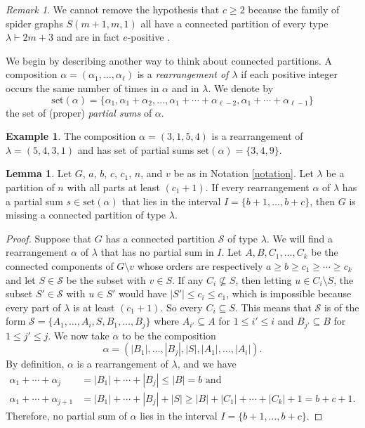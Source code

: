 \documentclass[12pt]{amsart}  %
\theoremstyle{definition}
\newtheorem{lemma}[theorem]{Lemma}
\newtheorem{example}[theorem]{Example}
\theoremstyle{remark}
\newtheorem{remark}[theorem]{Remark}
\numberwithin{equation}{section}
\begin{document}
\begin{remark}
We cannot remove the hypothesis that $c\geq 2$ because the family of spider graphs $S(m+1,m,1)$ all have a connected partition of every type $\lambda\vdash 2m+3$ and are in fact $e$-positive \cite[Theorem 3.2]{eposclawcon}.
\end{remark}

We begin by describing another way to think about connected partitions. A composition $\alpha=(\alpha_1,\ldots,\alpha_\ell)$ is a \emph{rearrangement of $\lambda$} if each positive integer occurs the same number of times in $\alpha$ and in $\lambda$. We denote by
\begin{equation*}
\text{set}(\alpha)=\{\alpha_1,\alpha_1+\alpha_2,\ldots,\alpha_1+\cdots+\alpha_{\ell-2},\alpha_1+\cdots+\alpha_{\ell-1}\}
\end{equation*}
the set of (proper) \emph{partial sums} of $\alpha$.

\begin{example}
The composition $\alpha=(3,1,5,4)$ is a rearrangement of $\lambda=(5,4,3,1)$ and has set of partial sums $\text{set}(\alpha)=\{3,4,9\}$.
\end{example}

\begin{lemma}\label{lem:partsums} Let $G$, $a$, $b$, $c$, $c_1$, $n$, and $v$ be as in Notation \ref{notation}. Let $\lambda$ be a partition of $n$ with all parts at least $(c_1+1)$. If every rearrangement $\alpha$ of $\lambda$ has a partial sum $s\in\text{set}(\alpha)$ that lies in the interval $I=\{b+1,\ldots,b+c\}$, then $G$ is missing a connected partition of type $\lambda$. 
\end{lemma}

\begin{proof}
Suppose that $G$ has a connected partition $\mathcal S$ of type $\lambda$. We will find a rearrangement $\alpha$ of $\lambda$ that has no partial sum in $I$. Let $A,B,C_1,\ldots,C_k$ be the connected components of $G\setminus v$ whose orders are respectively $a\geq b\geq c_1\geq \cdots\geq c_k$ and let $S\in\mathcal S$ be the subset with $v\in S$. If any $C_i\nsubseteq S$, then letting $u\in C_i\setminus S$, the subset $S'\in\mathcal S$ with $u\in S'$ would have $|S'|\leq c_i\leq c_1$, which is impossible because every part of $\lambda$ is at least $(c_1+1)$. So every $C_i\subseteq S$. This means that $\mathcal S$ is of the form
$\mathcal S=\{A_1,\ldots,A_i,S,B_1,\ldots,B_j\}$
where $A_{i'}\subseteq A$ for $1\leq i'\leq i$ and $B_{j'}\subseteq B$ for $1\leq j'\leq j$. We now take $\alpha$ to be the composition
\begin{equation*}
\alpha=(|B_1|,\ldots,|B_j|,|S|,|A_1|,\ldots,|A_i|).
\end{equation*}
By definition, $\alpha$ is a rearrangement of $\lambda$, and we have
\begin{align*}
\alpha_1+\cdots+\alpha_j&=|B_1|+\cdots+|B_j|\leq |B|=b\text{ and }\\
\alpha_1+\cdots+\alpha_{j+1}&=|B_1|+\cdots+|B_j|+|S|\geq|B|+|C_1|+\cdots+|C_k|+1=b+c+1.
\end{align*}
Therefore, no partial sum of $\alpha$ lies in the interval $I=\{b+1,\ldots,b+c\}$.
\end{proof}
\end{document}
